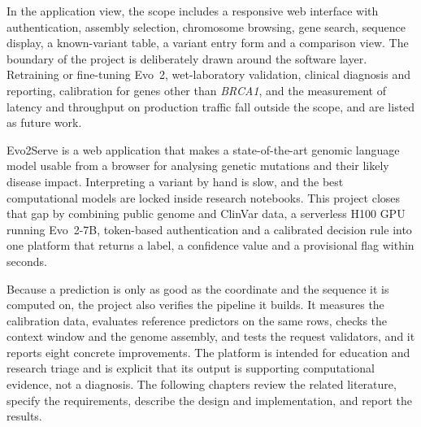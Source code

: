In the application view, the scope includes a responsive web interface with authentication, assembly selection, chromosome browsing, gene search, sequence display, a known-variant table, a variant entry form and a comparison view. The boundary of the project is deliberately drawn around the software layer. Retraining or fine-tuning Evo~2, wet-laboratory validation, clinical diagnosis and reporting, calibration for genes other than \textit{BRCA1}, and the measurement of latency and throughput on production traffic fall outside the scope, and are listed as future work.

\vspace{4pt}
Evo2Serve is a web application that makes a state-of-the-art genomic language model usable from a browser for analysing genetic mutations and their likely disease impact. Interpreting a variant by hand is slow, and the best computational models are locked inside research notebooks. This project closes that gap by combining public genome and ClinVar data, a serverless H100 GPU running Evo~2-7B, token-based authentication and a calibrated decision rule into one platform that returns a label, a confidence value and a provisional flag within seconds.

Because a prediction is only as good as the coordinate and the sequence it is computed on, the project also verifies the pipeline it builds. It measures the calibration data, evaluates reference predictors on the same rows, checks the context window and the genome assembly, and tests the request validators, and it reports eight concrete improvements. The platform is intended for education and research triage and is explicit that its output is supporting computational evidence, not a diagnosis. The following chapters review the related literature, specify the requirements, describe the design and implementation, and report the results.
